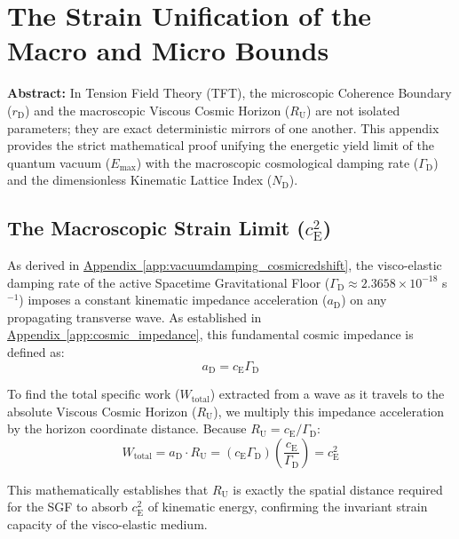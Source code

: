 \chapter{The Strain Unification of the Macro and Micro Bounds}
\label{app:strain_unification}

\noindent\textbf{Abstract:} In Tension Field Theory (TFT), the microscopic Coherence Boundary ($r_{\mathrm{D}}$) and the macroscopic Viscous Cosmic Horizon ($R_{\mathrm{U}}$) are not isolated parameters; they are exact deterministic mirrors of one another. This appendix provides the strict mathematical proof unifying the energetic yield limit of the quantum vacuum ($E_{\mathrm{max}}$) with the macroscopic cosmological damping rate ($\Gamma_{\mathrm{D}}$) and the dimensionless Kinematic Lattice Index ($N_{\mathrm{D}}$).

\section{The Macroscopic Strain Limit ($c_{\mathrm{E}}^2$)}
\label{sec:macroscopic_strain_limit}

As derived in \hyperref[app:vacuumdamping_cosmicredshift]{Appendix~\ref*{app:vacuumdamping_cosmicredshift}}, the visco-elastic damping rate of the active Spacetime Gravitational Floor ($\Gamma_{\mathrm{D}} \approx 2.3658 \times 10^{-18}$ s$^{-1}$) imposes a constant kinematic impedance acceleration ($a_{\mathrm{D}}$) on any propagating transverse wave. As established in \hyperref[app:cosmic_impedance]{Appendix~\ref*{app:cosmic_impedance}}, this fundamental cosmic impedance is defined as:
\begin{equation}
    a_{\mathrm{D}} = c_{\mathrm{E}} \Gamma_{\mathrm{D}}
\end{equation}

To find the total specific work ($W_{\mathrm{total}}$) extracted from a wave as it travels to the absolute Viscous Cosmic Horizon ($R_{\mathrm{U}}$), we multiply this impedance acceleration by the horizon coordinate distance. Because $R_{\mathrm{U}} = c_{\mathrm{E}}/\Gamma_{\mathrm{D}}$:
\begin{equation}
    W_{\mathrm{total}} = a_{\mathrm{D}} \cdot R_{\mathrm{U}} = (c_{\mathrm{E}} \Gamma_{\mathrm{D}})\left(\frac{c_{\mathrm{E}}}{\Gamma_{\mathrm{D}}}\right) = c_{\mathrm{E}}^2
\end{equation}

This mathematically establishes that $R_{\mathrm{U}}$ is exactly the spatial distance required for the SGF to absorb $c_{\mathrm{E}}^2$ of kinematic energy, confirming the invariant strain capacity of the visco-elastic medium.


